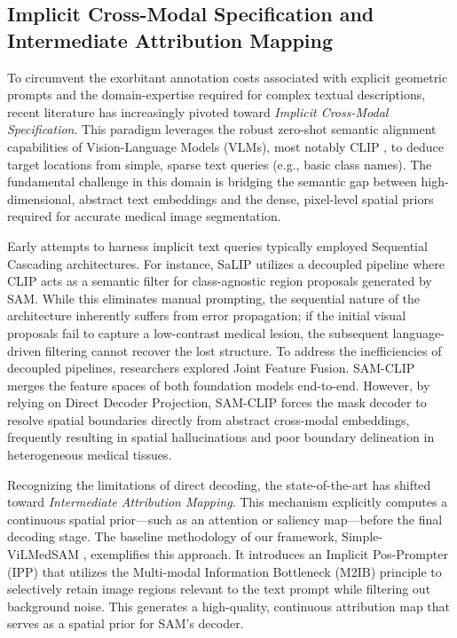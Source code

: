 \documentclass[onecolumn]{IEEEtran}
\numberwithin{equation}{section}
\theoremstyle{definition}
\theoremstyle{remark}
\begin{document}
\subsection{Implicit Cross-Modal Specification and Intermediate Attribution Mapping}

To circumvent the exorbitant annotation costs associated with explicit geometric prompts and the domain-expertise required for complex textual descriptions, recent literature has increasingly pivoted toward \textit{Implicit Cross-Modal Specification}. This paradigm leverages the robust zero-shot semantic alignment capabilities of Vision-Language Models (VLMs), most notably CLIP \cite{radford2021learning}, to deduce target locations from simple, sparse text queries (e.g., basic class names). The fundamental challenge in this domain is bridging the semantic gap between high-dimensional, abstract text embeddings and the dense, pixel-level spatial priors required for accurate medical image segmentation.

Early attempts to harness implicit text queries typically employed Sequential Cascading architectures. For instance, SaLIP \cite{aleem2024test} utilizes a decoupled pipeline where CLIP acts as a semantic filter for class-agnostic region proposals generated by SAM. While this eliminates manual prompting, the sequential nature of the architecture inherently suffers from error propagation; if the initial visual proposals fail to capture a low-contrast medical lesion, the subsequent language-driven filtering cannot recover the lost structure. To address the inefficiencies of decoupled pipelines, researchers explored Joint Feature Fusion. SAM-CLIP \cite{wang2024sam} merges the feature spaces of both foundation models end-to-end. However, by relying on Direct Decoder Projection, SAM-CLIP forces the mask decoder to resolve spatial boundaries directly from abstract cross-modal embeddings, frequently resulting in spatial hallucinations and poor boundary delineation in heterogeneous medical tissues.

Recognizing the limitations of direct decoding, the state-of-the-art has shifted toward \textit{Intermediate Attribution Mapping}. This mechanism explicitly computes a continuous spatial prior—such as an attention or saliency map—before the final decoding stage. The baseline methodology of our framework, Simple-ViLMedSAM \cite{qian2024simplevilmedsam}, exemplifies this approach. It introduces an Implicit Pos-Prompter (IPP) that utilizes the Multi-modal Information Bottleneck (M2IB) principle \cite{wang2023visual} to selectively retain image regions relevant to the text prompt while filtering out background noise. This generates a high-quality, continuous attribution map that serves as a spatial prior for SAM's decoder. 
\end{document}
